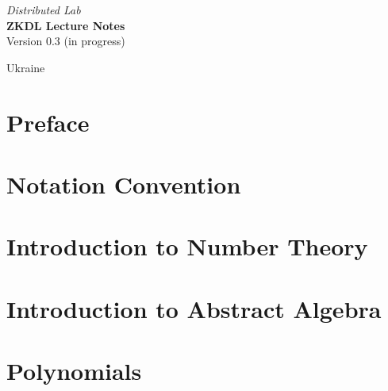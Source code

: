 \documentclass{zkdl-template}
\def\maketitle{
    \begin{center}
        {\Large\sffamily \emph{Distributed Lab}} \\ \vspace{30mm}
        {\huge\sffamily\bfseries ZKDL Lecture Notes} \\ \vspace{5mm}
        {Version 0.3 (in progress)} \\ \vspace{10mm}
    \end{center}
    
    \vfill

    \begin{center}
        {Ukraine} \\ \vspace{2mm}
        {\sffamily \the\year}
    \end{center}

    \thispagestyle{empty}
    \pagebreak
}
\begin{document}
    \maketitle


    \pagecolor{white}

    \vspace*{\fill}
    
    \begin{abstract}
        \fontsize{10}{12}\selectfont
        
    \end{abstract}

    \vspace*{\fill}

    \thispagestyle{empty}
    \newpage


    \pagestyle{fancy}
    \pagecolor{white}

    \tableofcontents

    \pagebreak


    \section*{Preface}
    


    \section{Notation Convention}\label{section:notation}
    

    \section{Introduction to Number Theory}\label{section:number-theory}
    

    \section{Introduction to Abstract Algebra}\label{section:abstract-algebra}
    

    \section{Polynomials}\label{section:polynomial-rings}
    
\end{document}
